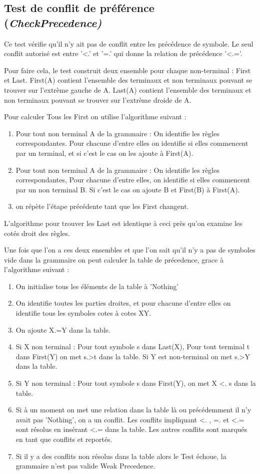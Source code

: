 	\subsection{Test de conflit de préférence (\emph{CheckPrecedence)}}
		Ce test vérifie qu'il n'y ait pas de conflit entre les précédence
		de symbole. Le seul conflit autorisé est entre '<.' et '=.' qui donne
		la relation de précédence '<.='.

		Pour faire cela, le test construit deux ensemble pour chaque non-terminal :
		First et Last. First(A) contient l'ensemble des terminaux et non terminaux 
		pouvant se trouver sur l'extrème gauche de A. Last(A) contient l'ensemble
		des terminaux et non terminaux pouvant se trouver sur l'extrème droide de A. 

		Pour calculer Tous les First on utilise l'algorithme suivant :
		\begin{enumerate}
			\item Pour tout non terminal A de la grammaire : On identifie les règles correspondantes.
			Pour chacune d'entre elles on identifie si elles commencent par un terminal, et si
			c'est le cas on les ajoute à First(A).
			\item Pour tout non terminal A de la grammaire : On identifie les règles correspondantes,
			Pour chacune d'entre elles, on identifie si elles commencent par un non terminal B.
			Si c'est le cas on ajoute B et First(B) à First(A). 
			\item on répète l'étape précédente tant que les First changent.
		\end{enumerate}
		L'algorithme pour trouver les Last est identique à ceci près qu'on examine les cotés droit des règles.
		
		Une fois que l'on a ces deux ensembles et que l'on sait qu'il n'y a pas de symboles vide dans
		la grammaire on  peut calculer la table de précedence, grace à l'algorithme suivant :
		\begin{enumerate}
			\item On initialise tous les éléments de la table à 'Nothing'
			\item On identifie toutes les parties droites, et pour chacune d'entre elles on identifie tous les
			symboles cotes à cotes XY.
			\item On ajoute X.=Y dans la table.
			\item Si X non terminal : Pour tout symbole s dans Last(X), Pour tout terminal t dans First(Y)
				on met s.>t dans la table. Si Y est non-terminal on met s.>Y dans la table.
			\item Si Y non terminal : Pour tout symbole s dans First(Y), on met X <. s dans la table.
			\item Si à un moment on met une relation dans la table là ou précédemment il n'y avait pas 'Nothing',
				on a un conflit. Les conflits impliquant <. , =. et <.= sont résolus en insérant <.= dans
				la table. Les autres conflits sont marqués en tant que conflits et reportés. 
			\item Si il y a des conflits non résolus dans la table alors le Test échoue, la grammaire n'est pas valide
			Weak Precedence.
		\end{enumerate}
